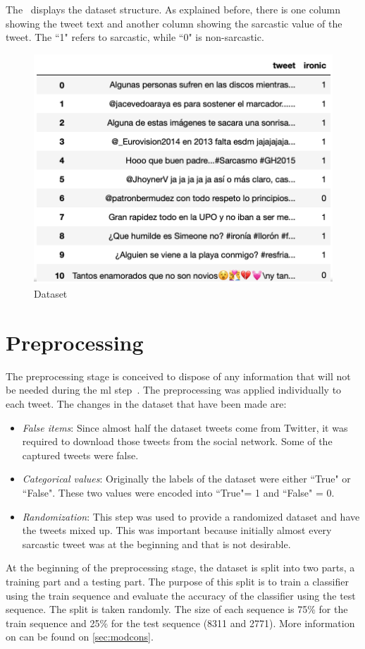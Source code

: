 The~ displays the dataset structure. As explained before, there is one column showing the tweet text and another column showing the sarcastic value of the tweet. The ``1" refers to sarcastic, while ``0" is non-sarcastic.
\begin{figure}
	\centering
	\includegraphics[scale=0.8]{img/dataset.png}
	\caption{Dataset}
	\label{fig:dataset}
\end{figure}

\section{Preprocessing}
\label{sec:preprocessing}
The preprocessing stage is conceived to dispose of any information that will not be needed during the \ac{ml} step~\cite{preprocess}. The preprocessing was applied individually to each tweet.
The changes in the dataset that have been made are:
\begin{itemize}
	\item \textit{False items}: Since almost half the dataset tweets come from Twitter, it was required to download those tweets from the social network. Some of the captured tweets were false.
	\item \textit{Categorical values}: Originally the labels of the dataset were either ``True" or ``False". These two values were encoded into ``True"= 1 and ``False" = 0.
	\item \textit{Randomization}: This step was used to provide a randomized dataset and have the tweets mixed up. This was important because initially almost every sarcastic tweet was at the beginning and that is not desirable.
\end{itemize}
At the beginning of the preprocessing stage, the dataset is split into two parts, a training part and a testing part. The purpose of this split is to train a classifier using the train sequence and evaluate the accuracy of the classifier using the test sequence. The split is taken randomly. The size of each sequence is 75\% for the train sequence and 25\% for the test sequence (8311 and 2771). More information on can be found on \cref{sec:modcons}.
